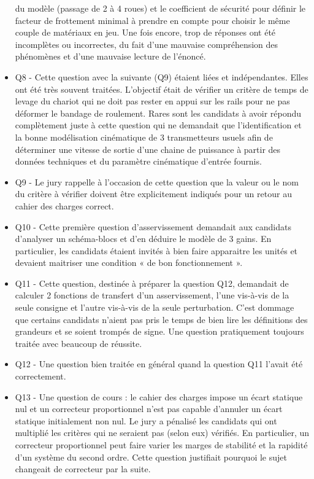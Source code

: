 \documentclass[10pt,fleqn]{article} %
\begin{document}
\begin{itemize}
du modèle (passage de 2 à 4 roues) et le coefficient de sécurité pour définir le facteur de frottement
minimal à prendre en compte pour choisir le même couple de matériaux en jeu. Une fois encore, trop
de réponses ont été incomplètes ou incorrectes, du fait d’une mauvaise compréhension des phénomènes
et d’une mauvaise lecture de l’énoncé.
\item Q8 - Cette question avec la suivante (Q9) étaient liées et indépendantes. Elles ont été très souvent
traitées. L’objectif était de vérifier un critère de temps de levage du chariot qui ne doit pas rester
en appui sur les rails pour ne pas déformer le bandage de roulement. Rares sont les candidats à
avoir répondu complètement juste à cette question qui ne demandait que l’identification et la bonne
modélisation cinématique de 3 transmetteurs usuels afin de déterminer une vitesse de sortie d’une
chaine de puissance à partir des données techniques et du paramètre cinématique d’entrée fournis.
\item Q9 - Le jury rappelle à l’occasion de cette question que la valeur ou le nom du critère à vérifier doivent
être explicitement indiqués pour un retour au cahier des charges correct.
\item Q10 - Cette première question d’asservissement demandait aux candidats d’analyser un schéma-blocs
et d’en déduire le modèle de 3 gains. En particulier, les candidats étaient invités à bien faire apparaitre
les unités et devaient maitriser une condition « de bon fonctionnement ».
\item Q11 - Cette question, destinée à préparer la question Q12, demandait de calculer 2 fonctions de
transfert d’un asservissement, l’une vis-à-vis de la seule consigne et l’autre vis-à-vis de la seule
perturbation. C’est dommage que certains candidats n’aient pas pris le temps de bien lire les définitions
des grandeurs et se soient trompés de signe. Une question pratiquement toujours traitée avec beaucoup
de réussite.
\item Q12 - Une question bien traitée en général quand la question Q11 l’avait été correctement.
\item Q13 - Une question de cours : le cahier des charges impose un écart statique nul et un correcteur
proportionnel n’est pas capable d’annuler un écart statique initialement non nul. Le jury a pénalisé
les candidats qui ont multiplié les critères qui ne seraient pas (selon eux) vérifiés. En particulier, un
correcteur proportionnel peut faire varier les marges de stabilité et la rapidité d’un système du second
ordre. Cette question justifiait pourquoi le sujet changeait de correcteur par la suite.

\end{itemize}
\end{document}
